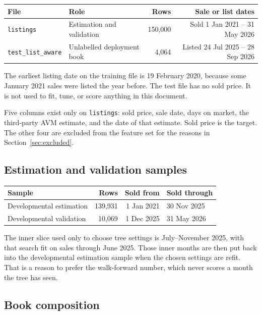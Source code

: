 \documentclass[11pt]{article}
\begin{document}
\begin{center}
\begin{tabular}{llrr}
\toprule
File & Role & Rows & Sale or list dates \\
\midrule
\texttt{listings} & Estimation and validation & 150{,}000 & Sold 1 Jan 2021 -- 31 May 2026 \\
\texttt{test\_list\_aware} & Unlabelled deployment book & 4{,}064 & Listed 24 Jul 2025 -- 28 Sep 2026 \\
\bottomrule
\end{tabular}
\end{center}

The earliest listing date on the training file is 19 February 2020, because some January 2021 sales were listed the year before. The test file has no sold price. It is not used to fit, tune, or score anything in this document.

Five columns exist only on \texttt{listings}: sold price, sale date, days on market, the third-party AVM estimate, and the date of that estimate. Sold price is the target. The other four are excluded from the feature set for the reasons in Section~\ref{sec:excluded}.

\subsection{Estimation and validation samples}

\begin{center}
\begin{tabular}{lrrl}
\toprule
Sample & Rows & Sold from & Sold through \\
\midrule
Developmental estimation & 139{,}931 & 1 Jan 2021 & 30 Nov 2025 \\
Developmental validation & 10{,}069 & 1 Dec 2025 & 31 May 2026 \\
\bottomrule
\end{tabular}
\end{center}

The inner slice used only to choose tree settings is July--November 2025, with that search fit on sales through June 2025. Those inner months are then put back into the developmental estimation sample when the chosen settings are refit. That is a reason to prefer the walk-forward number, which never scores a month the tree has seen.

\subsection{Book composition}
\end{document}
